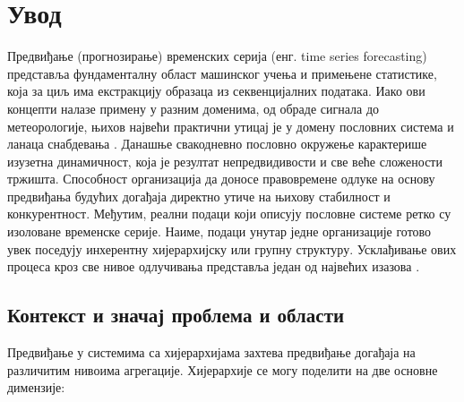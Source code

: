 \documentclass[12pt,oneside]{memoir}
\begin{document}
\frontmatter
\naslovna
\komisija
\apstrakt
\tableofcontents*

\mainmatter

\chapter{Увод}

Предвиђање (прогнозирање) временских серија (енг. time series forecasting) представља фундаменталну област машинског учења и примењене статистике, која за циљ има екстракцију образаца из секвенцијалних података. Иако ови концепти налазе примену у разним доменима, од обраде сигнала до метеорологије, њихов највећи практични утицај је у домену пословних система и ланаца снабдевања \cite{makridakis2020m4}. Данашње свакодневно пословно окружење карактерише изузетна динамичност, која је резултат непредвидивости и све веће сложености тржишта. Способност организација да доносе правовремене одлуке на основу предвиђања будућих догађаја директно утиче на њихову стабилност и конкурентност. Међутим, реални подаци који описују пословне системе ретко су изоловане временске серије. Наиме, подаци унутар једне организације готово увек поседују инхерентну хијерархијску или групну структуру. Усклађивање ових процеса кроз све нивое одлучивања представља један од највећих изазова \cite{hyndman2021forecasting}.

\section{Контекст и значај проблема и области}

Предвиђање у системима са хијерархијама захтева предвиђање догађаја на различитим нивоима агрегације.  Хијерархије се могу поделити на  две основне димензије:
\end{document}
